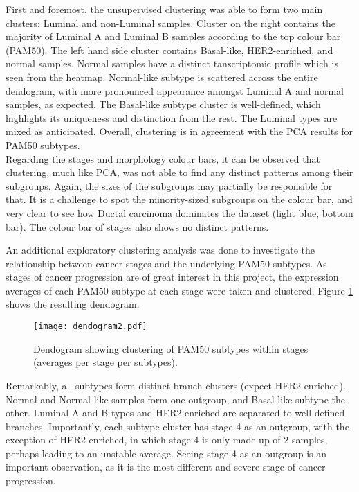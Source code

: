     First and foremost, the unsupervised clustering was able to form two main clusters: Luminal and non-Luminal samples. Cluster on the right contains the majority of Luminal A and Luminal B samples according to the top colour bar (PAM50). The left hand side cluster contains Basal-like, HER2-enriched, and normal samples. Normal samples have a distinct tanscriptomic profile which is seen from the heatmap. Normal-like subtype is scattered across the entire dendogram, with more pronounced appearance amongst Luminal A and normal samples, as expected. The Basal-like subtype cluster is well-defined, which highlights its uniqueness and distinction from the rest. The Luminal types are mixed as anticipated. Overall, clustering is in agreement with the PCA results for PAM50 subtypes. \\    
    Regarding the stages and morphology colour bars, it can be observed that clustering, much like PCA, was not able to find any distinct patterns among their subgroups. Again, the sizes of the subgroups may partially be responsible for that. It is a challenge to spot the minority-sized subgroups on the colour bar, and very clear to see how Ductal carcinoma dominates the dataset (light blue, bottom bar). The colour bar of stages also shows no distinct patterns. \\ 
    \newline
    
    
    An additional exploratory clustering analysis was done to investigate the relationship between cancer stages and the underlying PAM50 subtypes. As stages of cancer progression are of great interest in this project, the expression averages of each PAM50 subtype at each stage were taken and clustered. Figure \ref{fig:dendogram} shows the resulting dendogram. 
    
            \begin{figure}[!h]
            \centering
            \texttt{[image: dendogram2.pdf]}
            \caption[Dendogram of PAM50 and stage subgroups clustering]{Dendogram showing clustering of PAM50 subtypes within stages (averages per stage per subtypes).}
            \label{fig:dendogram}
            \end{figure}
    
    Remarkably, all subtypes form distinct branch clusters (expect HER2-enriched). Normal and Normal-like samples form one outgroup, and Basal-like subtype the other. Luminal A and B types and HER2-enriched are separated to well-defined branches. Importantly, each subtype cluster has stage 4 as an outgroup, with the exception of HER2-enriched, in which stage 4 is only made up of 2 samples, perhaps leading to an unstable average. Seeing stage 4 as an outgroup is an important observation, as it is the most different and severe stage of cancer progression. 
    
